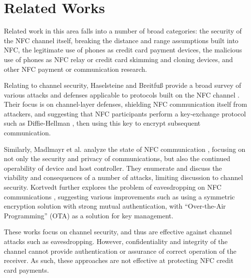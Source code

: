 \section{Related Works}
\label{sec:related}


Related work in this area falls into a number of broad categories:
     the security of the NFC channel itself,
     breaking the distance and range assumptions built into NFC,
     the legitimate use of phones as credit card payment devices,
     the malicious use of phones as NFC relay or credit card skimming and cloning devices,
     and other NFC payment or communication research.



Relating to channel security, Haselsteine and Breitfu{\ss} provide a broad survey of various attacks and defenses applicable to protocols built on the NFC channel \cite{haselsteiner2006security}.
Their focus is on channel-layer defenses, shielding NFC communication itself from attackers,
    and suggesting that NFC participants perform a key-exchange protocol such as Diffie-Hellman \cite{diffiehellman},
    then using this key to encrypt subsequent communication.

Similarly, Madlmayr et al. analyze the state of NFC communication \cite{madlmayr2008nfc},
    focusing on not only the security and privacy of communications, but also the continued operability of device and host controller.
They enumerate and discuss the viability and consequences of a number of attacks, limiting discussion to channel security.
Kortvedt further explores the problem of eavesdropping on NFC communications \cite{kortvedt2009securing},
    suggesting various improvements such as using a symmetric encryption solution with strong mutual authentication,
    with ``Over-the-Air Programming'' (OTA) as a solution for key management.

These works \cite{haselsteiner2006security, kortvedt2009securing, madlmayr2008nfc} focus on channel security,
    and thus are effective against channel attacks such as eavesdropping.
However, confidentiality and integrity of the channel cannot provide authentication or assurance of correct operation of the receiver.
As such, these approaches are not effective at protecting NFC credit card payments.

